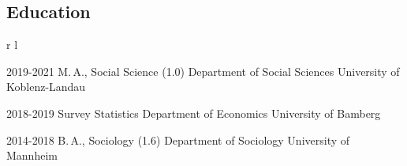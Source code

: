 \documentclass[10pt]{FreemanCV}
\begin{document}
\begin{paracol}{2}

\section{Education} 




\begin{supertabular}{r l} 


	\qualificationentry
		{2019-2021}
		{M.\,A., Social Science \textsc{(1.0)}}
		{} 
		{Department of Social Sciences}
		{University of Koblenz-Landau}

	\qualificationentry
		{2018-2019}
		{Survey Statistics}
		{} 
		{Department of Economics} 
		{University of Bamberg}

	\qualificationentry
		{2014-2018}
		{B.\,A., Sociology \textsc{(1.6)}}
		{} 
		{Department of Sociology}
		{University of Mannheim}


\end{supertabular}




	

\end{paracol}
\end{document}
